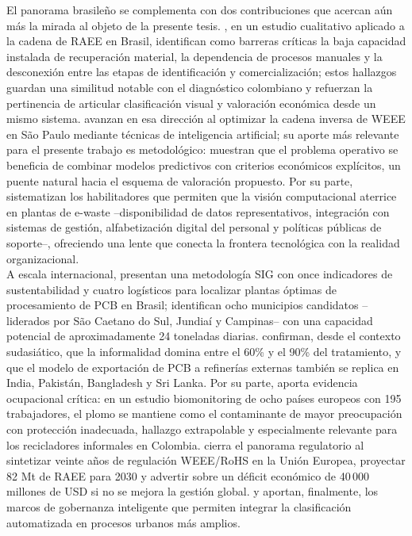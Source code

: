 El panorama brasileño se complementa con dos contribuciones que acercan aún más la mirada al objeto de la presente tesis. \cite{oliveiranetoCriticalBarriersMaterial2025}, en un estudio cualitativo aplicado a la cadena de RAEE en Brasil, identifican como barreras críticas la baja capacidad instalada de recuperación material, la dependencia de procesos manuales y la desconexión entre las etapas de identificación y comercialización; estos hallazgos guardan una similitud notable con el diagnóstico colombiano y refuerzan la pertinencia de articular clasificación visual y valoración económica desde un mismo sistema. \cite{oliveiranetoArtificialIntelligencebasedOptimization2025} avanzan en esa dirección al optimizar la cadena inversa de WEEE en São Paulo mediante técnicas de inteligencia artificial; su aporte más relevante para el presente trabajo es metodológico: muestran que el problema operativo se beneficia de combinar modelos predictivos con criterios económicos explícitos, un puente natural hacia el esquema de valoración propuesto. Por su parte, \cite{sharmaEnablersComputerVision2023} sistematizan los habilitadores que permiten que la visión computacional aterrice en plantas de e-waste --disponibilidad de datos representativos, integración con sistemas de gestión, alfabetización digital del personal y políticas públicas de soporte--, ofreciendo una lente que conecta la frontera tecnológica con la realidad organizacional.\\

A escala internacional, \cite{ottoniSustainabilityAssessmentBest2023} presentan una metodología SIG con once indicadores de sustentabilidad y cuatro logísticos para localizar plantas óptimas de procesamiento de PCB en Brasil; identifican ocho municipios candidatos --liderados por São Caetano do Sul, Jundiaí y Campinas-- con una capacidad potencial de aproximadamente 24 toneladas diarias. \cite{widanapathiranaElectricalElectronicWaste2023} confirman, desde el contexto sudasiático, que la informalidad domina entre el 60\% y el 90\% del tratamiento, y que el modelo de exportación de PCB a refinerías externas también se replica en India, Pakistán, Bangladesh y Sri Lanka. Por su parte, \cite{leeseHBM4EUEwasteStudy2025} aporta evidencia ocupacional crítica: en un estudio biomonitoring de ocho países europeos con 195 trabajadores, el plomo se mantiene como el contaminante de mayor preocupación con protección inadecuada, hallazgo extrapolable y especialmente relevante para los recicladores informales en Colombia. \cite{serpe20YearsEwaste2025} cierra el panorama regulatorio al sintetizar veinte años de regulación WEEE/RoHS en la Unión Europea, proyectar 82 Mt de RAEE para 2030 y advertir sobre un déficit económico de 40\,000 millones de USD si no se mejora la gestión global. \cite{guariniArtificialIntelligenceUrban2024} y \cite{bushuyevConceptualFrameworkSustainable2025} aportan, finalmente, los marcos de gobernanza inteligente que permiten integrar la clasificación automatizada en procesos urbanos más amplios.

